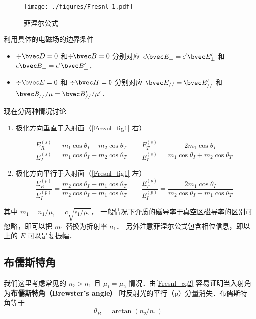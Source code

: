 

\begin{figure}[ht]
\centering
\texttt{[image: ./figures/Fresnl\_1.pdf]}
\caption{菲涅尔公式} \label{Fresnl_fig1}
\end{figure}
 
利用具体的电磁场的边界条件 %
\begin{itemize}
\item $\div \bvec D = 0$ 和$\div \bvec B = 0$  分别对应 $\epsilon \bvec E_\bot = \epsilon' \bvec E'_\bot$ 和 $\epsilon \bvec B_\bot = \epsilon' \bvec B'_\bot$．

\item $\div \bvec E = 0$ 和 $\div \bvec H = 0$ 分别对应 $\bvec E_{//} = \bvec E'_{//}$ 和 $\bvec B_{//}/\mu = \bvec B'_{//}/\mu'$．
\end{itemize}

现在分两种情况讨论
\begin{enumerate}
\item 极化方向垂直于入射面（\autoref{Fresnl_fig1} 右）

\begin{equation}
\frac{E_R^{(s)}}{E_I^{(s)}} =  \frac{m_1\cos{\theta_I} - m_2\cos\theta_T}{m_1\cos\theta_I + m_2\cos\theta_T}
\qquad
\frac{E_T^{(s)}}{E_I^{(s)}} = \frac{2 m_1\cos\theta_I}{m_1\cos\theta_I + m_2\cos\theta_T}
\end{equation}

\item 极化方向平行于入射面（\autoref{Fresnl_fig1} 左）
\begin{equation}\label{Fresnl_eq2}
\frac{E_R^{(p)}}{E_I^{(p)}} =  \frac{m_2\cos\theta_I - m_1\cos\theta_T}{m_2 \cos\theta_I + m_1\cos\theta_T}
\qquad
\frac{E_T^{(p)}}{E_I^{(p)}} =  \frac{2 m_1\cos\theta_I}{m_2\cos\theta_I + m_1\cos\theta_T}
\end{equation}
\end{enumerate}
其中 $m_1=n_1/\mu_1 = c\sqrt{\epsilon_1/\mu_1}$， 一般情况下介质的磁导率于真空区磁导率的区别可忽略，即可以把 $m_1$ 替换为折射率 $n_1$． 另外注意菲涅尔公式包含相位信息，即以上的 $E$ 可以是复振幅．

\subsection{布儒斯特角}
我们这里考虑常见的 $n_2>n_1$ 且 $\mu_1 = \mu_2$ 情况．由\autoref{Fresnl_eq2} 容易证明当入射角为\textbf{布儒斯特角（Brewster's angle）} 时反射光的平行（p）分量消失．布儒斯特角等于
\begin{equation}
\theta_B = \arctan (n_2/n_1)
\end{equation}
